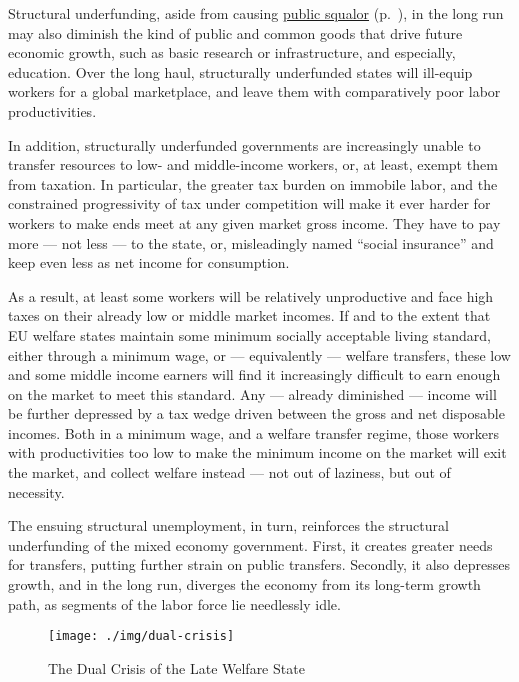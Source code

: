 \documentclass[11pt,a4paper,oneside]{article}
\begin{document}
Structural underfunding, aside from causing \hyperref[sec:public-squalor]{public squalor} (p.~\pageref{sec:public-squalor}), in the long run may also diminish the kind of public and common goods that drive future economic growth, such as basic research or infrastructure, and especially, education.
Over the long haul, structurally underfunded states will ill-equip workers for a global marketplace, and leave them with comparatively poor labor productivities.

In addition, structurally underfunded governments are increasingly unable to transfer resources to low- and middle-income workers, or, at least, exempt them from taxation.
In particular, the greater tax burden on immobile labor, and the constrained progressivity of tax under competition will make it ever harder for workers to make ends meet at any given market gross income.
They have to pay more --- not less --- to the state, or, misleadingly named ``social insurance'' and keep even less as net income for consumption.

As a result, at least some workers will be relatively unproductive and face high taxes on their already low or middle market incomes.
If and to the extent that \gls{EU} welfare states maintain some minimum socially acceptable living standard, either through a minimum wage, or --- equivalently --- welfare transfers, these low and some middle income earners will find it increasingly difficult to earn enough on the market to meet this standard.
Any --- already diminished --- income will be further depressed by a tax wedge driven between the gross and net disposable incomes.
Both in a minimum wage, and a welfare transfer regime, those workers with productivities too low to make the minimum income on the market will exit the market, and collect welfare instead --- not out of laziness, but out of necessity.

The ensuing structural unemployment, in turn, reinforces the structural underfunding of the mixed economy government.
First, it creates greater needs for transfers, putting further strain on public transfers.
Secondly, it also depresses growth, and in the long run, diverges the economy from its long-term growth path, as segments of the labor force lie needlessly idle.

\begin{figure}[htbp]
	\begin{center}
	\texttt{[image: ./img/dual-crisis]}
	\caption{The Dual Crisis of the Late Welfare State}
	\label{fig:dual-crisis}
	\end{center}
\end{figure} %
\end{document}

